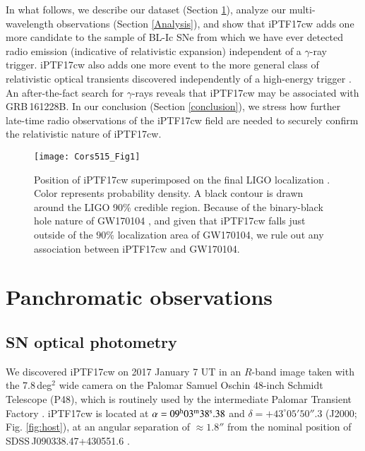 \documentclass[twocolumn]{emulateapj}
\begin{document}
In what follows, we describe our dataset (Section \ref{Observations}), analyze our multi-wavelength observations (Section \ref{Analysis}), and show that iPTF17cw adds one more candidate to the sample of  BL-Ic SNe from which we have ever detected radio emission (indicative of relativistic expansion) independent of a $\gamma$-ray trigger. iPTF17cw also adds one more event to the more general class of relativistic optical transients discovered independently of a high-energy trigger \citep{Cenko2013,Cenko2015}. An after-the-fact search for $\gamma$-rays reveals that iPTF17cw may be associated with GRB\,161228B. In our conclusion (Section \ref{conclusion}), we stress how further late-time radio observations of the iPTF17cw field are needed to securely confirm the relativistic nature of iPTF17cw.  

\begin{figure}
\begin{center}
\texttt{[image: Cors515\_Fig1]}
\vspace{-1.0cm}
\caption{Position of iPTF17cw superimposed on the final LIGO localization \citep{LVC21056}. Color represents probability density. A black contour is drawn around the LIGO 90\% credible region. Because of the binary-black hole nature of GW170104 \citep{Abbott2017}, and given that iPTF17cw falls just outside of the $90\%$ localization area of GW170104, we rule out any association between iPTF17cw and GW170104.  \label{bayes}}
\end{center}
\end{figure}

\section{Panchromatic observations}
\label{Observations}
\subsection{SN optical photometry}
\label{Opticalphotometry}
We discovered iPTF17cw on 2017 January 7 UT in an $R$-band image taken with the 7.8\,deg$^2$ wide camera on the Palomar Samuel Oschin 48-inch Schmidt Telescope (P48), which is routinely used by the intermediate Palomar Transient Factory \citep{Cao2016,Law2009,Masci2017}.  iPTF17cw is located at $\alpha=09^{\rm h}03^{\rm m}38^{\rm s}.38$ and $\delta=+43^{\circ}05'50''.3$ (J2000; Fig. \ref{fig:host}), at an angular separation of $\approx 1.8''$ from the nominal position of SDSS\,J090338.47+430551.6 \citep{York2000}. 
\end{document}
